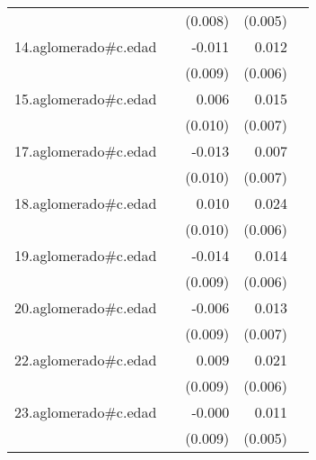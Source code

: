 {\begin{longtable}{l*{4}{D{.}{.}{-1}}}
            &                     &     (0.008)         &     (0.005)         &                     \\
\addlinespace
14.aglomerado#c.edad&                     &      -0.011         &       0.012\sym{*}  &                     \\
            &                     &     (0.009)         &     (0.006)         &                     \\
\addlinespace
15.aglomerado#c.edad&                     &       0.006         &       0.015\sym{*}  &                     \\
            &                     &     (0.010)         &     (0.007)         &                     \\
\addlinespace
17.aglomerado#c.edad&                     &      -0.013         &       0.007         &                     \\
            &                     &     (0.010)         &     (0.007)         &                     \\
\addlinespace
18.aglomerado#c.edad&                     &       0.010         &       0.024\sym{***}&                     \\
            &                     &     (0.010)         &     (0.006)         &                     \\
\addlinespace
19.aglomerado#c.edad&                     &      -0.014         &       0.014\sym{*}  &                     \\
            &                     &     (0.009)         &     (0.006)         &                     \\
\addlinespace
20.aglomerado#c.edad&                     &      -0.006         &       0.013         &                     \\
            &                     &     (0.009)         &     (0.007)         &                     \\
\addlinespace
22.aglomerado#c.edad&                     &       0.009         &       0.021\sym{***}&                     \\
            &                     &     (0.009)         &     (0.006)         &                     \\
\addlinespace
23.aglomerado#c.edad&                     &      -0.000         &       0.011\sym{*}  &                     \\
            &                     &     (0.009)         &     (0.005)         &                     \\

\end{longtable}}
